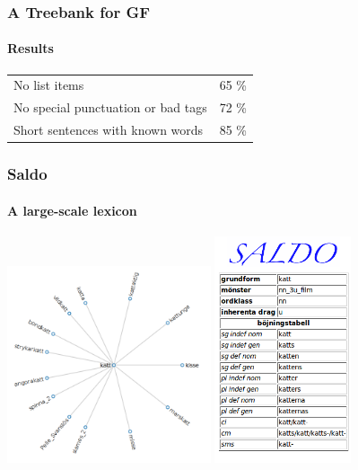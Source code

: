 \documentclass[10pt]{beamer}
\begin{document}
\begin{frame}[containsverbatim]
\frametitle{A Treebank for GF}
\framesubtitle{Results} 
\begin{tabular}{ll}
No list items & 65 \%\\
No special punctuation or bad tags& 72 \%\\
Short sentences with known words & 85 \%\\
\end{tabular}
\end{frame}


\begin{frame}
\frametitle{Saldo}
\framesubtitle{A large-scale lexicon}
\includegraphics[width=60mm]{saldograph.png}
\includegraphics[width=40mm]{saldotab.png}
\end{frame}
\end{document}
